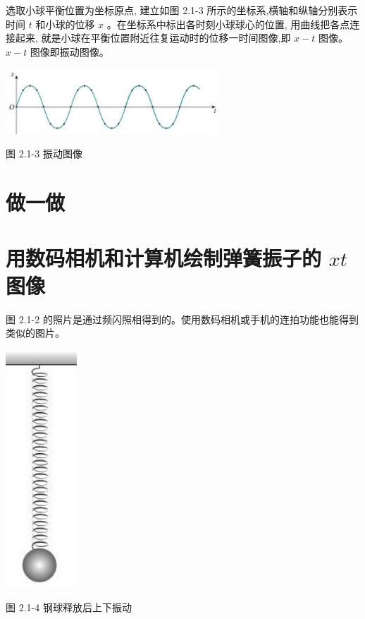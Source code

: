 \documentclass[10pt]{article}
\begin{document}
选取小球平衡位置为坐标原点, 建立如图 2.1-3 所示的坐标系,横轴和纵轴分别表示时间 \(t\) 和小球的位移 \(x\) 。在坐标系中标出各时刻小球球心的位置, 用曲线把各点连接起来, 就是小球在平衡位置附近往复运动时的位移一时间图像,即 \(x - t\) 图像。 \(x - t\) 图像即振动图像。

\begin{center}
\includegraphics[max width=0.6\textwidth]{images/01910e4c-ebb8-7d2c-8f2f-2375bc1d2d12_38_170293.jpg}
\end{center}

图 2.1-3 振动图像

\section*{做一做}

\section*{用数码相机和计算机绘制弹簧振子的 \(x t\) 图像}

图 2.1-2 的照片是通过频闪照相得到的。使用数码相机或手机的连拍功能也能得到类似的图片。

\begin{center}
\includegraphics[max width=0.2\textwidth]{images/01910e4c-ebb8-7d2c-8f2f-2375bc1d2d12_39_388810.jpg}
\end{center}

图 2.1-4 钢球释放后上下振动
\end{document}
